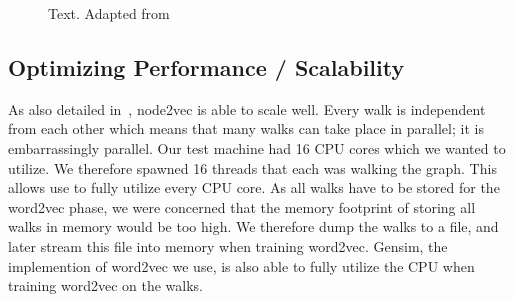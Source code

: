 


\begin{figure}[tbp]%
  \centering
  

\caption[short desc]{Text. Adapted from \cite{word2vec-param-learning}}%
\label{fig:n2v-figure}%
\end{figure}

\subsection{Optimizing Performance / Scalability}
As also detailed in~\cite{node2vec}, node2vec is able to scale well. Every walk is independent from each other which means that many walks can take place in parallel; it is embarrassingly parallel. Our test machine had 16 CPU cores which we wanted to utilize. We therefore spawned 16 threads that each was walking the graph. This allows use to fully utilize every CPU core. As all walks have to be stored for the word2vec phase, we were concerned that the memory footprint of storing all walks in memory would be too high. We therefore dump the walks to a file, and later stream this file into memory when training word2vec. Gensim, the implemention of word2vec we use, is also able to fully utilize the CPU when training word2vec on the walks.

